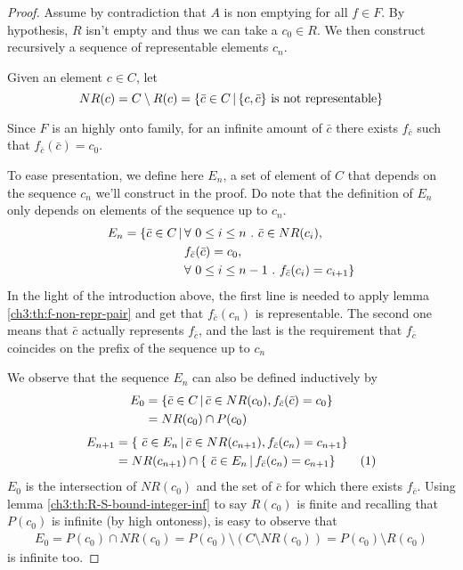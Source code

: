 \begin{proof}
	Assume by contradiction that $A$ is non emptying for all $f \in F$. By hypothesis, $R$ isn't empty and thus we can take a $c_0 \in R$. We then construct recursively a sequence of representable elements $c_n$.

	Given an element $c \in C$, let
	\[
	NR(c) = C \setminus R(c) = \{ \bar{c} \in C \,\vert\, \{ c, \bar{c} \} \text{ is not representable} \}
	\]

	Since $F$ is an highly onto family, for an infinite amount of $\bar{c}$ there exists $f_{\bar{c}}$ such that $f_{\bar{c}}(\bar{c}) = c_0$.

	To ease presentation, we define here $E_n$, a set of element of $C$ that depends on the sequence $c_n$ we'll construct in the proof. Do note that the definition of $E_n$ only depends on elements of the sequence up to $c_n$.
	\begin{align*}
		E_n = \{\bar{c} \in C \svert & \forall\ 0 \le i \le n \ .\ \bar{c} \in NR(c_i), \\
		& f_{\bar{c}}(\bar{c}) = c_0, \\
		& \forall\ 0 \le i \le n - 1 \ .\ f_{\bar{c}}(c_i) = c_{i + 1} \}
	\end{align*}
	In the light of the introduction above, the first line is needed to apply lemma \ref{ch3:th:f-non-repr-pair} and get that $f_{\bar{c}}(c_n)$ is representable. The second one means that $\bar{c}$ actually represents $f_{\bar{c}}$, and the last is the requirement that $f_{\bar{c}}$ coincides on the prefix of the sequence up to $c_n$

	We observe that the sequence $E_n$ can also be defined inductively by
	\begin{align*}
		E_0 &= \{ \bar{c} \in C \,\vert\, \bar{c} \in NR(c_0), f_{\bar{c}}(\bar{c}) = c_0 \} \\
		&= NR(c_0) \cap P(c_0)
	\end{align*}
	\begin{align*}
		E_{n+1} &= \{\ \bar{c} \in E_n \svert \bar{c} \in NR(c_{n+1}), f_{\bar{c}}(c_n) = c_{n+1} \} \\
		&= NR(c_{n+1}) \cap \{\ \bar{c} \in E_n \svert f_{\bar{c}}(c_n) = c_{n+1} \} \addtocounter{equation}{1}\tag{\theequation} \label{ch4:eq:En-relation}
	\end{align*}
	$E_0$ is the intersection of $NR(c_0)$ and the set of $\bar{c}$ for which there exists $f_{\bar{c}}$. Using lemma \ref{ch3:th:R-S-bound-integer-inf} to say $R(c_0)$ is finite and recalling that $P(c_0)$ is infinite (by high ontoness), is easy to observe that
	\begin{align*}
		E_0 = P(c_0) \cap NR(c_0) = P(c_0) \setminus (C \setminus NR(c_0)) = P(c_0) \setminus R(c_0)
	\end{align*}
	is infinite too.


\end{proof}

